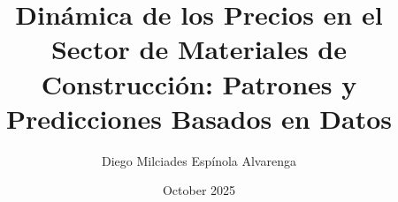 \usepackage{ragged2e} 
\usepackage{amsfonts}
\usepackage{csquotes}
\usepackage[spanish]{babel} %
\usepackage[backend=biber,style=numeric,sorting=none,maxbibnames=99]{biblatex} %
\usepackage{amsmath} %
\usepackage{amsthm} %
\usepackage{siunitx} %
\usepackage{graphicx} %
\usepackage{xcolor} %
\usepackage{import} %
\usepackage{changepage} %
\usepackage{multirow} %
\usepackage[
	Algoritmo
]{algorithm} %
\usepackage[
	noend
]{algpseudocode} %
\usepackage{caption} %
\usepackage[
	list=true
]{subcaption} %
\usepackage{booktabs} %
\usepackage{float} %
\usepackage{longtable} %
\usepackage{imakeidx} %
\usepackage{geometry} %
\usepackage{chngcntr} %
\usepackage{hyperref} %
\usepackage{amssymb} %
\usepackage{environ} %
\usepackage{mathrsfs} %
\usepackage{titlesec} %
\usepackage{enumitem} %
\usepackage{multicol} %
\usepackage{cleveref} %

\makeindex[title=ÍNDICE ALFABÉTICO]



\title{Dinámica de los Precios en el Sector de Materiales de Construcción: Patrones y Predicciones Basados en Datos}
\author{Diego Milciades Espínola Alvarenga}
\date{October 2025}

\geometry{
	a4paper, 
	tmargin = 2.5cm,
	bmargin = 2cm,
	rmargin = 1.5cm,
	lmargin = 2.5cm
}

